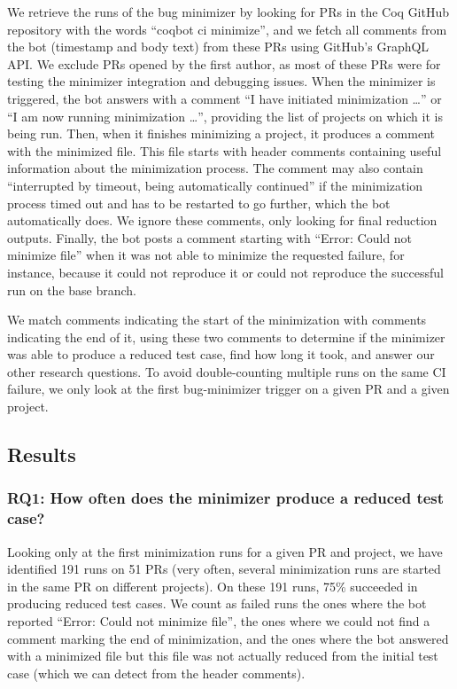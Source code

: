 \documentclass[a4paper,USenglish,cleveref,autoref,thm-restate]{lipics-v2021}
\begin{document}
We retrieve the runs of the bug minimizer by looking for PRs in the Coq GitHub repository with the words ``coqbot ci minimize'', and we fetch all comments from the bot (timestamp and body text) from these PRs using GitHub's GraphQL API.
We exclude PRs opened by the first author, as most of these PRs were for testing the minimizer integration and debugging issues.
When the minimizer is triggered, the bot answers with a comment ``I have initiated minimization \ldots'' or ``I am now running minimization \ldots'', providing the list of projects on which it is being run.
%
Then, when it finishes minimizing a project, it produces a comment with the minimized file.
%
This file starts with header comments containing useful information about the minimization process. %
%
The comment may also contain ``interrupted by timeout, being automatically continued'' if the minimization process timed out and has to be restarted to go further, which the bot automatically does.
%
We ignore these comments, only looking for final reduction outputs.
%
Finally, the bot posts a comment starting with ``Error: Could not minimize file'' when it was not able to minimize the requested failure, for instance, because it could not reproduce it or could not reproduce the successful run on the base branch.

We match comments indicating the start of the minimization with comments indicating the end of it, using these two comments to determine if the minimizer was able to produce a reduced test case, find how long it took, and answer our other research questions.
To avoid double-counting multiple runs on the same CI failure, we only look at the first bug-minimizer trigger on a given PR and a given project.

\subsection{Results}

\subsubsection{RQ1: How often does the minimizer produce a reduced test case?}

Looking only at the first minimization runs for a given PR and project, we have identified 191 runs on 51 PRs (very often, several minimization runs are started in the same PR on different projects).
On these 191 runs, 75\% succeeded in producing reduced test cases. We count as failed runs the ones where the bot reported ``Error: Could not minimize file'', the ones where we could not find a comment marking the end of minimization, and the ones where the bot answered with a minimized file but this file was not actually reduced from the initial test case (which we can detect from the header comments).
\end{document}
